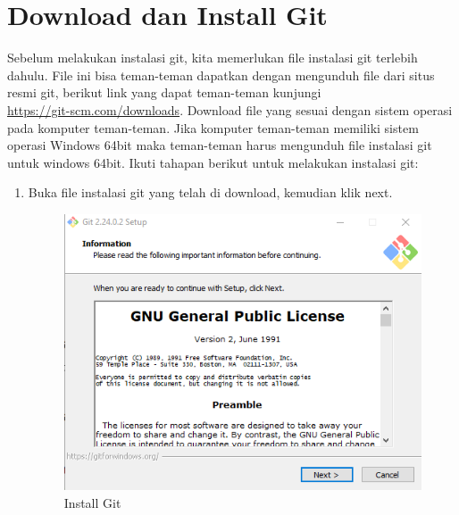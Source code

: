 \section{Download dan Install Git}
Sebelum melakukan instalasi git, kita memerlukan file instalasi git terlebih dahulu. File ini bisa teman-teman dapatkan dengan mengunduh file dari situs resmi git, berikut link yang dapat teman-teman kunjungi \\ \url{https://git-scm.com/downloads}. Download file yang sesuai dengan sistem operasi pada komputer teman-teman. Jika komputer teman-teman memiliki sistem operasi Windows 64bit maka teman-teman harus mengunduh file instalasi git untuk windows 64bit. Ikuti tahapan berikut untuk melakukan instalasi git:
\begin{enumerate}
\item Buka file instalasi git yang telah di download, kemudian klik next.
\begin{figure}[H]
\centering
\includegraphics[scale=.5]{figures/install_git1}
\caption{Install Git}
\label{install_git1}
\end{figure}


\end{enumerate}
